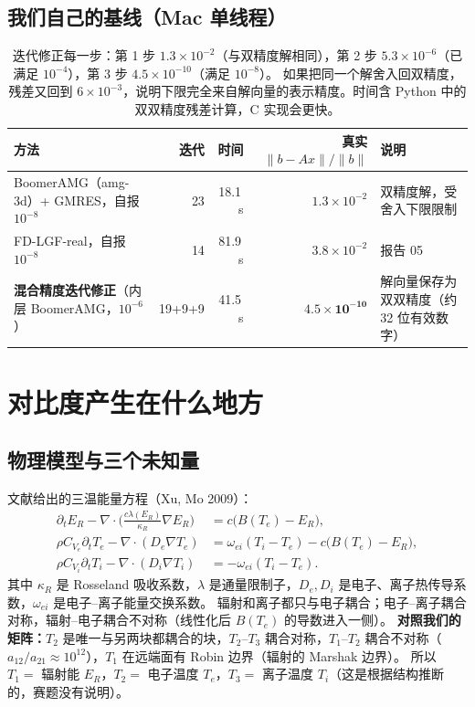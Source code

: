 \documentclass[11pt,a4paper]{ctexart}
\begin{document}
\subsection{我们自己的基线（Mac 单线程）}
\begin{table}[H]
\centering
\small
\begin{tabular}{p{5.2cm}rrrp{3.6cm}}
\toprule
方法 & 迭代 & 时间 & 真实 $\|b-Ax\|/\|b\|$ & 说明 \\
\midrule
BoomerAMG（amg-3d）+ GMRES，自报 $10^{-8}$ & 23 & 18.1\,s & $1.3\times10^{-2}$ & 双精度解，受舍入下限限制 \\
FD-LGF-real，自报 $10^{-8}$ & 14 & 81.9\,s & $3.8\times10^{-2}$ & 报告 05 \\
\textbf{混合精度迭代修正}（内层 BoomerAMG，$10^{-6}$） & 19+9+9 & 41.5\,s & $\mathbf{4.5\times10^{-10}}$ & 解向量保存为双双精度（约 32 位有效数字） \\
\bottomrule
\end{tabular}
\caption{迭代修正每一步：第 1 步 $1.3\times10^{-2}$（与双精度解相同），第 2 步 $5.3\times10^{-6}$（已满足 $10^{-4}$），第 3 步 $4.5\times10^{-10}$（满足 $10^{-8}$）。
如果把同一个解舍入回双精度，残差又回到 $6\times10^{-3}$，说明下限完全来自解向量的表示精度。时间含 Python 中的双双精度残差计算，C 实现会更快。}
\end{table}

\section{对比度产生在什么地方}
\subsection{物理模型与三个未知量}
文献给出的三温能量方程（Xu, Mo 2009）：
\begin{align*}
\partial_t E_R-\nabla\cdot\Big(\tfrac{c\lambda(E_R)}{\kappa_R}\nabla E_R\Big)&=c\big(B(T_e)-E_R\big),\\
\rho C_{V_e}\partial_t T_e-\nabla\cdot(D_e\nabla T_e)&=\omega_{ei}(T_i-T_e)-c\big(B(T_e)-E_R\big),\\
\rho C_{V_i}\partial_t T_i-\nabla\cdot(D_i\nabla T_i)&=-\omega_{ei}(T_i-T_e).
\end{align*}
其中 $\kappa_R$ 是 Rosseland 吸收系数，$\lambda$ 是通量限制子，$D_e,D_i$ 是电子、离子热传导系数，$\omega_{ei}$ 是电子--离子能量交换系数。
辐射和离子都只与电子耦合；电子--离子耦合对称，辐射--电子耦合不对称（线性化后 $B(T_e)$ 的导数进入一侧）。
\textbf{对照我们的矩阵：}$T_2$ 是唯一与另两块都耦合的块，$T_2$--$T_3$ 耦合对称，$T_1$--$T_2$ 耦合不对称（$a_{12}/a_{21}\approx10^{12}$），$T_1$ 在远端面有 Robin 边界（辐射的 Marshak 边界）。
所以 $T_1=$ 辐射能 $E_R$，$T_2=$ 电子温度 $T_e$，$T_3=$ 离子温度 $T_i$（这是根据结构推断的，赛题没有说明）。
\end{document}
